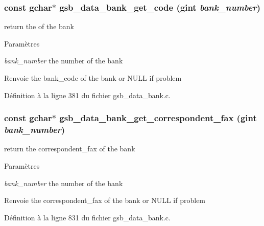 \subsubsection[{gsb\_\-data\_\-bank\_\-get\_\-code}]{\setlength{\rightskip}{0pt plus 5cm}const gchar$\ast$ gsb\_\-data\_\-bank\_\-get\_\-code (gint {\em bank\_\-number})}\label{gsb__data__bank_8c_a13a589498f9c111fae65c5fd5cb8b322}
return the of the bank


\begin{DoxyParams}{Paramètres}
\item[{\em bank\_\-number}]the number of the bank\end{DoxyParams}
\begin{DoxyReturn}{Renvoie}
the bank\_\-code of the bank or NULL if problem 
\end{DoxyReturn}


Définition à la ligne 381 du fichier gsb\_\-data\_\-bank.c.

\subsubsection[{gsb\_\-data\_\-bank\_\-get\_\-correspondent\_\-fax}]{\setlength{\rightskip}{0pt plus 5cm}const gchar$\ast$ gsb\_\-data\_\-bank\_\-get\_\-correspondent\_\-fax (gint {\em bank\_\-number})}\label{gsb__data__bank_8c_a797e13d2d47e9679d3994a0b84b2f6bf}
return the correspondent\_\-fax of the bank


\begin{DoxyParams}{Paramètres}
\item[{\em bank\_\-number}]the number of the bank\end{DoxyParams}
\begin{DoxyReturn}{Renvoie}
the correspondent\_\-fax of the bank or NULL if problem 
\end{DoxyReturn}


Définition à la ligne 831 du fichier gsb\_\-data\_\-bank.c.

